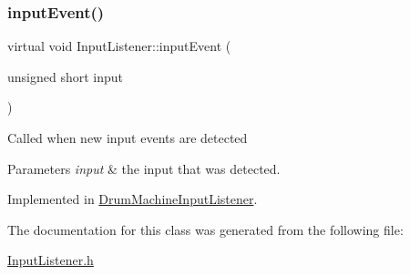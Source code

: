 \subsubsection{\texorpdfstring{input\+Event()}{inputEvent()}}
{\footnotesize\ttfamily virtual void Input\+Listener\+::input\+Event (\begin{DoxyParamCaption}\item[{unsigned short}]{input }\end{DoxyParamCaption})\hspace{0.3cm}{\ttfamily [pure virtual]}}

Called when new input events are detected 
\begin{DoxyParams}{Parameters}
{\em input} & the input that was detected. \\
\hline
\end{DoxyParams}


Implemented in \hyperlink{class_drum_machine_input_listener_a44a620b09b35885a26befe84fa6e1ab0}{Drum\+Machine\+Input\+Listener}.



The documentation for this class was generated from the following file\+:\begin{DoxyCompactItemize}
\item 
\hyperlink{_input_listener_8h}{Input\+Listener.\+h}\end{DoxyCompactItemize}
